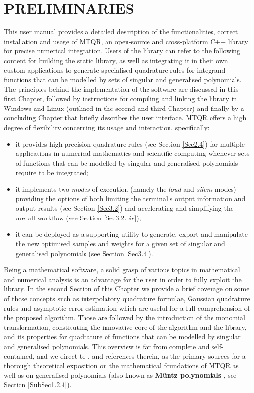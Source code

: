 \documentclass[a4paper, twosided]{book}
\begin{document}
\mainmatter

\chapter[Preliminaries]{\Huge \ttfamily PRELIMINARIES}

This user manual provides a detailed description of the functionalities, correct installation and usage of MTQR, an open-source and cross-platform C++ library for precise numerical integration. Users of the library can refer to the following content for building the static library, as well as integrating it in their own custom applications to generate specialised quadrature rules for integrand functions that can be modelled by sets of singular and generalised polynomials. The principles behind the implementation of the software are discussed in this first Chapter, followed by instructions for compiling and linking the library in Windows and Linux (outlined in the second and third Chapter) and finally by a concluding Chapter that briefly describes the user interface. MTQR offers a high degree of flexibility concerning its usage and interaction, specifically:
\begin{itemize}
    \item it provides high-precision quadrature rules (see Section \ref{Sec2.4}) for multiple applications in numerical mathematics and scientific computing whenever sets of  functions that can be modelled by singular and generalised polynomials require to be integrated;
    \item it implements two {\itshape modes} of execution (namely the {\itshape loud} and {\itshape silent} modes) providing the options of both limiting the terminal's output information and output results (see Section \ref{Sec3.2}) and accelerating and simplifying the overall workflow (see Section \ref{Sec3.2.bis});
    \item it can be deployed as a supporting utility to generate, export and manipulate the new optimised samples and weights for a given set of singular and generalised polynomials (see Section \ref{Sec3.4}).
\end{itemize}
Being a mathematical software, a solid grasp of various topics in mathematical and numerical analysis is an advantage for the user in order to fully exploit the library. In the second Section of this Chapter we provide a brief coverage on some of those concepts such as interpolatory quadrature formulae, Gaussian quadrature rules and asymptotic error estimation which are useful for a full comprehension of the proposed algorithm. Those are followed by the introduction of the monomial transformation, constituting the innovative core of the algorithm and the library, and its properties for quadrature of functions that can be modelled by singular and generalised polynomials. This overview is far from complete and self-contained, and we direct to \cite{Lombardi09, Lombardi21}, and references therein, as the primary sources for a thorough theoretical exposition on the mathematical foundations of MTQR as well as on generalised polynomials (also known as \color{poliDarkBlue} \textbf{Müntz polynomials} \color{black}, see Section \ref{SubSec1.2.4}).
\end{document}
